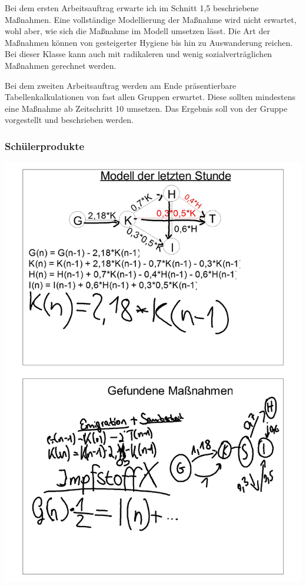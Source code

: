 Bei dem ersten Arbeitsauftrag erwarte ich im Schnitt 1,5 beschriebene Maßnahmen. Eine vollständige Modellierung der Maßnahme wird nicht erwartet, wohl aber, wie sich die Maßnahme im Modell umsetzen lässt. Die Art der Maßnahmen können von gesteigerter Hygiene bis hin zu Auswanderung reichen. Bei dieser Klasse kann auch mit radikaleren und wenig sozialverträglichen Maßnahmen gerechnet werden. 

Bei dem zweiten Arbeitsauftrag werden am Ende präsentierbare Tabellenkalkulationen von fast allen Gruppen erwartet. Diese sollten mindestens eine Maßnahme ab Zeitschritt 10 umsetzen. Das Ergebnis soll von der Gruppe vorgestellt und beschrieben werden.
\subsubsection*{Schülerprodukte}
\includegraphics[width=\textwidth]{projekt/leistung_3_1}
